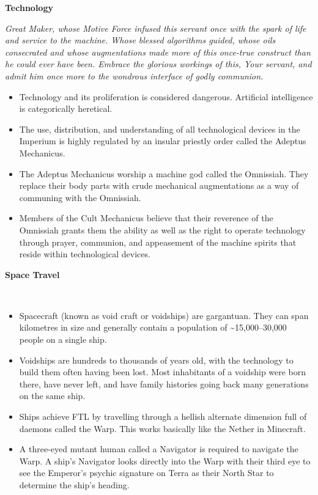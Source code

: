 \documentclass[10pt,a4paper]{article}
\newcommand{\rpgsection}[1]{%
  \vspace{0.8em}%
  {\headerfont\bfseries\Large #1}\par%
  \vspace{0.5em}%
}
\begin{document}
\begin{multicols}{2}
\rpgsection{Technology}
\textit{Great Maker, whose Motive Force infused this servant once with the spark of life and service to the machine. Whose blessed algorithms guided, whose oils consecrated and whose augmentations made more of this once-true construct than he could ever have been. Embrace the glorious workings of this, Your servant, and admit him once more to the wondrous interface of godly communion.}

\begin{itemize}
  \item Technology and its proliferation is considered dangerous. Artificial intelligence is categorically heretical.
  \item The use, distribution, and understanding of all technological devices in the Imperium is highly regulated by an insular priestly order called the Adeptus Mechanicus.
  \item The Adeptus Mechanicus worship a machine god called the Omnissiah. They replace their body parts with crude mechanical augmentations as a way of communing with the Omnissiah.
  \item Members of the Cult Mechanicus believe that their reverence of the Omnissiah grants them the ability as well as the right to operate technology through prayer, communion, and appeasement of the machine spirits that reside within technological devices.
\end{itemize}

\rpgsection{Space Travel}
\

\begin{itemize}
\textit{Between the stars the ancient unseen enemies of mankind wait and hunger. Every voyage into the nothing is a confrontation with horror, with the implacable things of the Warp, and with man's own innermost fears.}

  \item Spacecraft (known as void craft or voidships) are gargantuan. They can span kilometres in size and generally contain a population of \textasciitilde15,000–30,000 people on a single ship.
  \item Voidships are hundreds to thousands of years old, with the technology to build them often having been lost. Most inhabitants of a voidship were born there, have never left, and have family histories going back many generations on the same ship.
  \item Ships achieve FTL by travelling through a hellish alternate dimension full of daemons called the Warp. This works basically like the Nether in Minecraft.
  \item A three-eyed mutant human called a Navigator is required to navigate the Warp. A ship’s Navigator looks directly into the Warp with their third eye to see the Emperor’s psychic signature on Terra as their North Star to determine the ship’s heading.
\end{itemize}


\end{multicols}
\end{document}
